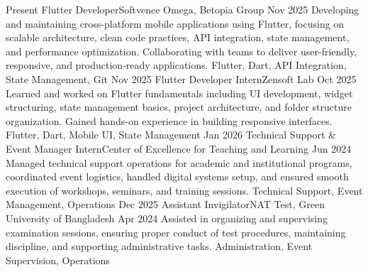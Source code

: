 %
%
%
\begin{experiences}
  \experience
    {Present}       {Flutter Developer}{Softvence Omega, Betopia Group}{}
    {Nov 2025}      {
                      Developing and maintaining cross-platform mobile applications using Flutter, focusing on scalable architecture, clean code practices, API integration, state management, and performance optimization. Collaborating with teams to deliver user-friendly, responsive, and production-ready applications.
                    }
                    {Flutter, Dart, API Integration, State Management, Git}
  \emptySeparator
  \experience
    {Nov 2025}      {Flutter Developer Intern}{Zensoft Lab}{}
    {Oct 2025}      {
                      Learned and worked on Flutter fundamentals including UI development, widget structuring, state management basics, project architecture, and folder structure organization. Gained hands-on experience in building responsive interfaces.
                    }
                    {Flutter, Dart, Mobile UI, State Management}
  \emptySeparator
  \experience
    {Jan 2026}      {Technical Support \& Event Manager Intern}{Center of Excellence for Teaching and Learning}{}
    {Jun 2024}      {
                      Managed technical support operations for academic and institutional programs, coordinated event logistics, handled digital systems setup, and ensured smooth execution of workshops, seminars, and training sessions.
                    }
                    {Technical Support, Event Management, Operations}
  \emptySeparator
  \experience
    {Dec 2025}      {Assistant Invigilator}{NAT Test, Green University of Bangladesh}{}
    {Apr 2024}      {
                      Assisted in organizing and supervising examination sessions, ensuring proper conduct of test procedures, maintaining discipline, and supporting administrative tasks.
                    }
                    {Administration, Event Supervision, Operations}
\end{experiences}
